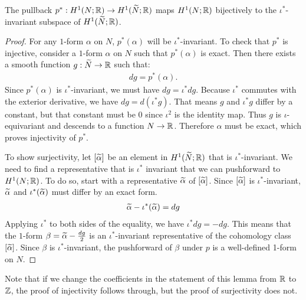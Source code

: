\begin{lem}
  \label{lem:injective}
  The pullback $p^{\ast}:H^1(N;\mathbb{R})\rightarrow H^1(\widetilde{N};\mathbb{R})$ maps $H^1(N; \mathbb{R})$ bijectively to the $\iota^{\ast}$-invariant subspace of   $H^1(\widetilde{N}; \mathbb{R})$.
\end{lem}
\begin{proof}
  For any $1$-form $\alpha$ on $N$, $p^{\ast}(\alpha)$ will be $\iota^{\ast}$-invariant.
  To check that $p^\ast$ is injective, consider a $1$-form $\alpha$ on $N$ such that $p^{\ast}(\alpha)$ is exact.
  Then there exists a smooth function $g:\widetilde{N} \to \mathbb{R}$ such that:
    \begin{align*}
        dg = p^{\ast} (\alpha).
    \end{align*}
    Since $p^{\ast}(\alpha)$ is $\iota^{\ast}$-invariant, we must have $dg = \iota^{\ast} dg$.
    Because $\iota^\ast$ commutes with the exterior derivative, we have $dg = d(\iota^{\ast}g)$.
    That means $g$ and $\iota^{\ast}g$ differ by a constant, but that constant must be $0$ since $\iota^2$ is the identity map.
    Thus $g$ is $\iota$-equivariant and descends to a function $N\rightarrow \mathbb{R}$. Therefore $\alpha$ must be exact, which proves injectivity of $p^{\ast}$.

    To show surjectivity, let $[\widetilde{\alpha}]$ be an element in $H^1(\widetilde{N}; \mathbb{R})$ that is $\iota^{\ast}$-invariant.  We need to find a representative that is $\iota^\ast$ invariant that we can pushforward to $H^1(N;\mathbb{R})$.  To do so,  start with a representative $\widetilde{\alpha}$ of $[\widetilde{\alpha}]$.
    Since $[\widetilde{\alpha}]$ is $\iota^\ast$-invariant, $\widetilde{\alpha}$ and $\iota^{\ast}(\widetilde{\alpha})$ must differ by an exact form.
    \begin{align*}
        \widetilde{\alpha} - \iota^{\ast}(\widetilde{\alpha}) = dg
    \end{align*}
    Applying $\iota^\ast$ to both sides of the equality, we have $\iota^{\ast}dg = -dg$.
    This means that the $1$-form $\beta = \widetilde{\alpha} - \frac{dg}{2}$ is an $\iota^{\ast}$-invariant representative of the cohomology class $[\widetilde{\alpha}]$.
    Since $\beta$ is $\iota^{\ast}$-invariant, the pushforward of $\beta$ under $p$ is a well-defined 1-form on $N$.
\end{proof}

  Note that if we change the coefficients in the statement of this lemma from $\mathbb{R}$ to $\mathbb{Z}$, the proof of injectivity follows through, but the proof of surjectivity does not.


